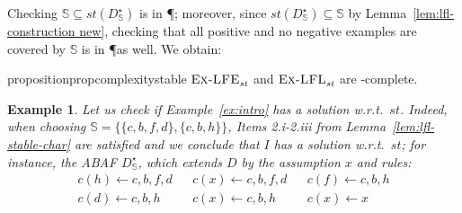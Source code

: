 \documentclass[letterpaper]{article} %
\newcommand{\stb}{\textit{st}}
\newcommand{\asms}{\asm}
\newcommand{\theory}{\mathit{Th}}
\newcommand{\asm}{\ensuremath{\mathcal{A}}}
\newcommand{\atoms}{\mathcal{L}}
\newcommand{\ruleset}{\mathcal{R}}
\newcommand{\assumptions}{\mathcal{A}}
\newcommand{\contra}{c}
\newcommand{\contrary}[1]{c(#1)}
\newcommand{\contraryempty}{c}
\newcommand{\ABAdef}{D=(\atoms,\ruleset,\assumptions,\contra)}
\newcommand{\setS}{\mathbb{S}}
\newcommand{\ExLFE}[2]{\textsc{Ex-LFE}_{#1}^{#2}}
\newcommand{\ExLFL}[2]{\textsc{Ex-LFL}_{#1}^{#2}}
\newtheorem{example}{Example}[section]
\newtheorem{definition}[example]{Definition}
\begin{document}
Checking $\setS\subseteq \stb(D_\setS^\star)$ is in \P; moreover, since $\stb(D_\setS^\star)\subseteq \setS$ by Lemma~\ref{lem:lfl-construction new}, checking that all positive and no negative examples are covered by $\setS$ is in \P as well. We obtain:%
\begin{restatable}{proposition}{propcomplexitystable}\label{prop:complexity-stable}
    $\ExLFE{\stb}{}$ and $\ExLFL{\stb}{}$ are \NP-complete.
\end{restatable}

\begin{example}\label{ex:intro solution}
    Let us check if Example~\ref{ex:intro} has a solution w.r.t.\ $\stb$. Indeed, when choosing $\setS=\{\{c,b,f,d\},\{c,b,h\}\}$, Items 2.i-2.iii from Lemma~\ref{lem:lfl-stable-char} are satisfied and we conclude that $I$ has a solution w.r.t.\ $\stb$; for instance, the ABAF $D_\setS^\star$,
    which extends $D$ by the assumption $x$ and rules:
    \begin{align*}
        \contrary{h}\gets c,b,f,d && \contrary{x}\gets c,b,f,d && \contrary{f}\gets c,b,h \\ \contrary{d}\gets c,b,h && \contrary{x}\gets c,b,h && \contrary{x}\gets x
    \end{align*}
\end{example}
\end{document}
